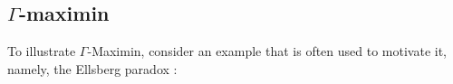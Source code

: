 \documentclass[a4paper]{article}
\newenvironment{CCM rewritten}
{\begingroup\color{blue}} %
{\endgroup}              %
\begin{document}
\subsection{$\Gamma$-maximin}\label{sect:gamma}


To illustrate $\Gamma$-Maximin, consider an example that is often used to motivate it, namely, the Ellsberg paradox \citep{ellsberg1961rasa}:
\end{document}
